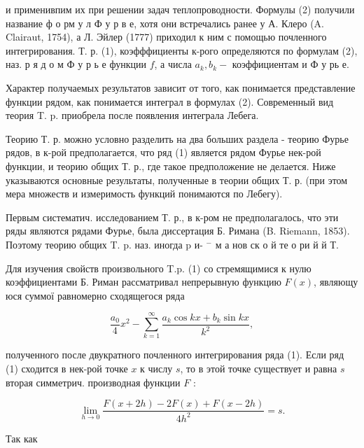\documentclass[10pt]{article}
\begin{document}
и применивпим их при решении задач теплопроводности. Формулы (2) получили название ф о рм у л Ф у р в е, хотя они встречались ранее у А. Клеро (A. Clairaut, 1754), а Л. Эйлер (1777) приходил к ним с помощью почленного интегрирования. Т. р. (1), коэфффициенты к-рого определяются по формулам (2), наз. р я д о м Ф у р ь е функции $f$, а числа $a_{k}, b_{k}-$ коэффициентам и Ф у рь е.



Характер получаемых результатов зависит от того, как понимается представление функции рядом, как понимается интеграл в формулах (2). Современный вид теория T. p. приобрела после появления интеграла Лебега.



Теорию Т. р. можно условно разделить на два больших раздела - теорию Фурье рядов, в к-рой предполагается, что ряд (1) является рядом Фурье нек-рой функции, и теорию общих Т. р., где такое предположение не делается. Ниже указываются основные результаты, полученные в теории общих Т. р. (при этом мера множеств и измеримость функций понимаются по Лебегу).



Первым систематич. исследованием Т. р., в к-ром не предполагалось, что эти ряды являются рядами Фурье, была диссертация Б. Римана (B. Riemann, 1853). Поэтому теорию общих T. p. наз. иногда $\mathrm{p}$ и- $^{-}$ м а нов ск о й те о ри й й Т.



Для изучения свойств произвольного T.p. (1) со стремящимися к нулю коэффициентами Б. Риман рассматривал непрерывную функцию $F(x)$, являющу юся суммої равномерно сходящегося ряда



\[

\frac{a_{0}}{4} x^{2}-\sum_{k=1}^{\infty} \frac{a_{k} \cos k x+b_{k} \sin k x}{k^{2}},

\]



полученного после двукратного почленного интегрирования ряда (1). Если ряд (1) сходится в нек-рой точке $x$ к числу $s$, то в этой точке существует и равна $s$ вторая симметрич. производная функции $F$ :



\[

\lim _{h \rightarrow 0} \frac{F(x+2 h)-2 F(x)+F(x-2 h)}{4 h^{2}}=s .

\]



Так как
\end{document}
